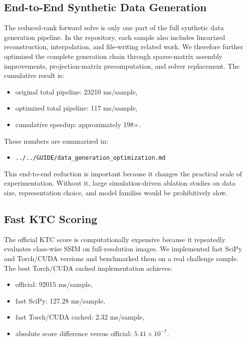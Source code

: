 \documentclass[11pt,a4paper]{article}
\begin{document}
\subsection{End-to-End Synthetic Data Generation}
The reduced-rank forward solve is only one part of the full synthetic data generation pipeline. In the repository, each sample also includes linearized reconstruction, interpolation, and file-writing related work. We therefore further optimized the complete generation chain through sparse-matrix assembly improvements, projection-matrix precomputation, and solver replacement. The cumulative result is:
\begin{itemize}[leftmargin=1.5em]
    \item original total pipeline: 23210 ms/sample,
    \item optimized total pipeline: 117 ms/sample,
    \item cumulative speedup: approximately 198$\times$.
\end{itemize}

These numbers are summarized in:
\begin{itemize}[leftmargin=1.5em]
    \item \texttt{../../GUIDE/data\_generation\_optimization.md}
\end{itemize}

This end-to-end reduction is important because it changes the practical scale of experimentation. Without it, large simulation-driven ablation studies on data size, representation choice, and model families would be prohibitively slow.

\subsection{Fast KTC Scoring}
The official KTC score is computationally expensive because it repeatedly evaluates class-wise SSIM on full-resolution images. We implemented fast SciPy and Torch/CUDA versions and benchmarked them on a real challenge sample. The best Torch/CUDA cached implementation achieves:
\begin{itemize}[leftmargin=1.5em]
    \item official: 92015 ms/sample,
    \item fast SciPy: 127.28 ms/sample,
    \item fast Torch/CUDA cached: 2.32 ms/sample,
    \item absolute score difference versus official: $5.41\times10^{-7}$.
\end{itemize}
\end{document}
